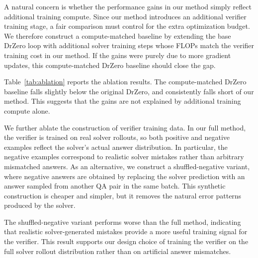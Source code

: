 \documentclass{article}
\begin{document}
A natural concern is whether the performance gains in our method simply reflect
additional training compute. Since our method introduces an additional verifier
training stage, a fair comparison must control for the extra optimization budget.
We therefore construct a compute-matched baseline by extending the base DrZero
loop with additional solver training steps whose FLOPs match the verifier
training cost in our method. If the gains were purely due to more gradient
updates, this compute-matched DrZero baseline should close the gap.

Table~\ref{tab:ablation} reports the ablation results. The compute-matched
DrZero baseline falls slightly below the original DrZero, and consistently falls
short of our method. This suggests that the gains are not explained
by additional training compute alone.

We further ablate the construction of verifier training data. In our full
method, the verifier is trained on real solver rollouts, so both positive and
negative examples reflect the solver's actual answer distribution. In
particular, the negative examples correspond to realistic solver mistakes rather
than arbitrary mismatched answers. As an alternative, we construct a
shuffled-negative variant, where negative answers are obtained by replacing the
solver prediction with an answer sampled from another QA pair in the same batch.
This synthetic construction is cheaper and simpler, but it removes the natural
error patterns produced by the solver.

The shuffled-negative variant performs worse than the full method, indicating
that realistic solver-generated mistakes provide a more useful training signal
for the verifier. This result supports our design choice of training the
verifier on the full solver rollout distribution rather than on artificial
answer mismatches.


\begin{table}[t]
\centering
\caption{Ablation results comparing compute-matched training and verifier data construction (EM, Qwen2.5-3B).}
\label{tab:ablation}
\end{table}
\end{document}
